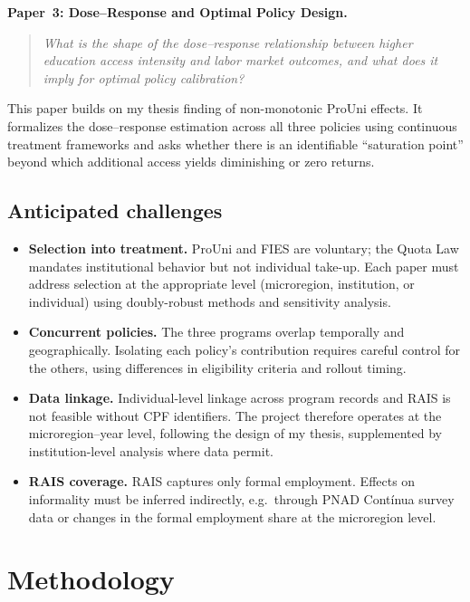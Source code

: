 \documentclass[a4paper,11pt]{article}
\begin{document}
\textbf{Paper~3: Dose--Response and Optimal Policy Design.}
\begin{quote}
\textit{What is the shape of the dose--response relationship between higher education access intensity and labor market outcomes, and what does it imply for optimal policy calibration?}
\end{quote}
This paper builds on my thesis finding of non-monotonic ProUni effects. It formalizes the dose--response estimation across all three policies using continuous treatment frameworks \citep{callaway2024} and asks whether there is an identifiable ``saturation point'' beyond which additional access yields diminishing or zero returns.

\subsection{Anticipated challenges}

\begin{itemize}[nosep]
    \item \textbf{Selection into treatment.} ProUni and FIES are voluntary; the Quota Law mandates institutional behavior but not individual take-up. Each paper must address selection at the appropriate level (microregion, institution, or individual) using doubly-robust methods and sensitivity analysis.
    \item \textbf{Concurrent policies.} The three programs overlap temporally and geographically. Isolating each policy's contribution requires careful control for the others, using differences in eligibility criteria and rollout timing.
    \item \textbf{Data linkage.} Individual-level linkage across program records and RAIS is not feasible without CPF identifiers. The project therefore operates at the microregion--year level, following the design of my thesis, supplemented by institution-level analysis where data permit.
    \item \textbf{RAIS coverage.} RAIS captures only formal employment. Effects on informality must be inferred indirectly, e.g.\ through PNAD Cont\'inua survey data or changes in the formal employment share at the microregion level.
\end{itemize}

\section{Methodology}
\end{document}
